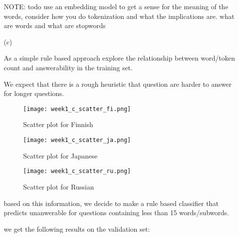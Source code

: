 \documentclass[11pt]{article}
\begin{document}
\begin{enumerate}
    NOTE: todo use an embedding model to get a sense for the meaning of the words, consider how you do tokenization and 
    what the implications are. what are words and what are stopwords

    \item[(c)] 
    
    As a simple rule based approach explore the relationship between word/token count and answerability in the training set. 

    We expect that there is a rough heuristic that question are harder to answer for longer questions. 

    \begin{figure}[ht]
        \centering
        \texttt{[image: week1\_c\_scatter\_fi.png]}
        \caption{Scatter plot for Finnish}
        \label{fig:scatter_fi}
    \end{figure}

    \begin{figure}[ht]
        \centering
        \texttt{[image: week1\_c\_scatter\_ja.png]}
        \caption{Scatter plot for Japanese}
        \label{fig:scatter_ja}
    \end{figure}
    
    \begin{figure}[ht]
        \centering
        \texttt{[image: week1\_c\_scatter\_ru.png]}
        \caption{Scatter plot for Russian}
        \label{fig:scatter_ru}
    \end{figure}


    based on this information, we decide to make a rule based classifier that predicts unanwerable for questions containing less than 15 words/subwords.

    we get the following results on the validation set:


\end{enumerate}
\end{document}
